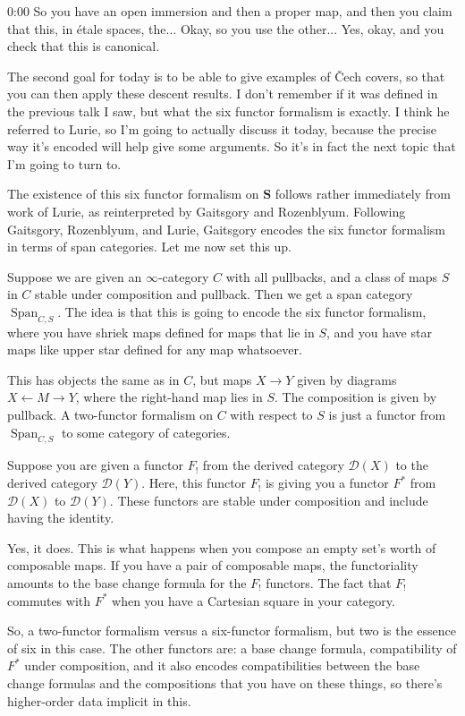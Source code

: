 \begin{unfinished}{0:00}
So you have an open immersion and then a proper map, and then you claim that this, in étale spaces, the... Okay, so you use the other... Yes, okay, and you check that this is canonical.

The second goal for today is to be able to give examples of Čech covers, so that you can then apply these descent results. I don't remember if it was defined in the previous talk I saw, but what the six functor formalism is exactly. I think he referred to Lurie, so I'm going to actually discuss it today, because the precise way it's encoded will help give some arguments. So it's in fact the next topic that I'm going to turn to.

The existence of this six functor formalism on $\mathbf{S}$ follows rather immediately from work of Lurie, as reinterpreted by Gaitsgory and Rozenblyum. Following Gaitsgory, Rozenblyum, and Lurie, Gaitsgory encodes the six functor formalism in terms of span categories. Let me now set this up.

Suppose we are given an $\infty$-category $C$ with all pullbacks, and a class of maps $S$ in $C$ stable under composition and pullback. Then we get a span category $\operatorname{Span}_{C,S}$. The idea is that this is going to encode the six functor formalism, where you have shriek maps defined for maps that lie in $S$, and you have star maps like upper star defined for any map whatsoever.

This has objects the same as in $C$, but maps $X \to Y$ given by diagrams $X \leftarrow M \to Y$, where the right-hand map lies in $S$. The composition is given by pullback. A two-functor formalism on $C$ with respect to $S$ is just a functor from $\operatorname{Span}_{C,S}$ to some category of categories.


Suppose you are given a functor $F_!$ from the derived category $\mathcal{D}(X)$ to the derived category $\mathcal{D}(Y)$. Here, this functor $F_!$ is giving you a functor $F^*$ from $\mathcal{D}(X)$ to $\mathcal{D}(Y)$. These functors are stable under composition and include having the identity.

Yes, it does. This is what happens when you compose an empty set's worth of composable maps. If you have a pair of composable maps, the functoriality amounts to the base change formula for the $F_!$ functors. The fact that $F_!$ commutes with $F^*$ when you have a Cartesian square in your category.

So, a two-functor formalism versus a six-functor formalism, but two is the essence of six in this case. The other functors are: a base change formula, compatibility of $F^*$ under composition, and it also encodes compatibilities between the base change formulas and the compositions that you have on these things, so there's higher-order data implicit in this.


\end{unfinished}

